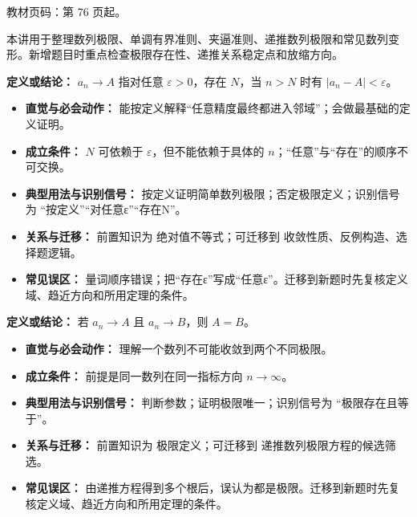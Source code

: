
\begin{knowledgeBox}
教材页码：第 76 页起。

本讲用于整理数列极限、单调有界准则、夹逼准则、递推数列极限和常见数列变形。新增题目时重点检查极限存在性、递推关系稳定点和放缩方向。
\end{knowledgeBox}

\begin{knowledgeBox}
\textbf{定义或结论：} $a_n\to A$ 指对任意 $\varepsilon>0$，存在 $N$，当 $n>N$ 时有 $|a_n-A|<\varepsilon$。

\begin{itemize}
  \item \textbf{直觉与必会动作：} 能按定义解释“任意精度最终都进入邻域”；会做最基础的定义证明。
  \item \textbf{成立条件：} $N$ 可依赖于 $\varepsilon$，但不能依赖于具体的 $n$；“任意”与“存在”的顺序不可交换。
  \item \textbf{典型用法与识别信号：} 按定义证明简单数列极限；否定极限定义；识别信号为 “按定义”“对任意ε”“存在N”。
  \item \textbf{关系与迁移：} 前置知识为 绝对值不等式；可迁移到 收敛性质、反例构造、选择题逻辑。
  \item \textbf{常见误区：} 量词顺序错误；把“存在ε”写成“任意ε”。迁移到新题时先复核定义域、趋近方向和所用定理的条件。
\end{itemize}
\end{knowledgeBox}

\begin{knowledgeBox}
\textbf{定义或结论：} 若 $a_n\to A$ 且 $a_n\to B$，则 $A=B$。

\begin{itemize}
  \item \textbf{直觉与必会动作：} 理解一个数列不可能收敛到两个不同极限。
  \item \textbf{成立条件：} 前提是同一数列在同一指标方向 $n\to\infty$。
  \item \textbf{典型用法与识别信号：} 判断参数；证明极限唯一；识别信号为 “极限存在且等于”。
  \item \textbf{关系与迁移：} 前置知识为 极限定义；可迁移到 递推数列极限方程的候选筛选。
  \item \textbf{常见误区：} 由递推方程得到多个根后，误认为都是极限。迁移到新题时先复核定义域、趋近方向和所用定理的条件。
\end{itemize}
\end{knowledgeBox}

